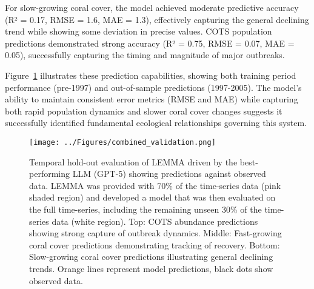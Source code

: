 For slow-growing coral cover, the model achieved moderate predictive accuracy (R² = 0.17, RMSE = 1.6, MAE = 1.3), effectively capturing the general declining trend while showing some deviation in precise values. COTS population predictions demonstrated strong accuracy (R² = 0.75, RMSE = 0.07, MAE = 0.05), successfully capturing the timing and magnitude of major outbreaks.

Figure~\ref{fig:validation_combined} illustrates these prediction capabilities, showing both training period performance (pre-1997) and out-of-sample predictions (1997-2005). 
The model's ability to maintain consistent error metrics (RMSE and MAE) while capturing both rapid population dynamics and slower coral cover changes suggests it successfully identified fundamental ecological relationships governing this system.

\begin{figure}[H]
\centering
\texttt{[image: ../Figures/combined\_validation.png]}
\caption{Temporal hold-out evaluation of LEMMA driven by the best-performing LLM (GPT-5) showing predictions against observed data. LEMMA was provided with 70\% of the time-series data (pink shaded region) and developed a model that was then evaluated on the full time-series, including the remaining unseen 30\% of the time-series data (white region). Top: COTS abundance predictions showing strong capture of outbreak dynamics. Middle: Fast-growing coral cover predictions demonstrating tracking of recovery. Bottom: Slow-growing coral cover predictions illustrating general declining trends. Orange lines represent model predictions, black dots show observed data.}
\label{fig:validation_combined}
\end{figure}

